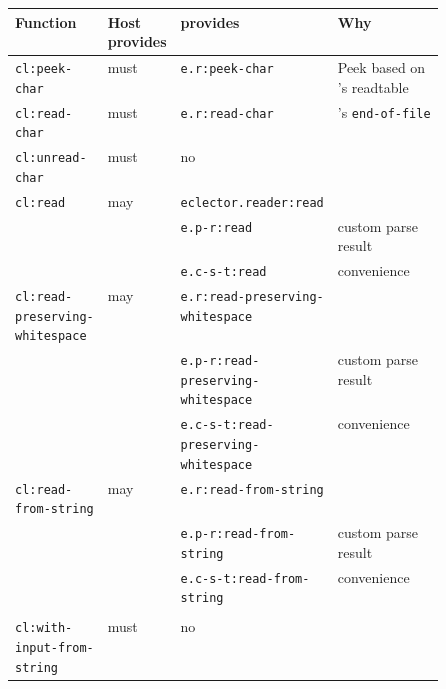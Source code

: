 \begin{table}
  \begin{tabular}{l|p{.08\linewidth}|p{0.25\linewidth}|p{0.25\linewidth}}
    Function                               & Host provides & \sysname{} provides                         & Why \\
    \hline
    \texttt{cl:peek-char}                  & must          & \texttt{e.r:peek-char}                      & Peek based on \sysname{}'s readtable\\
    \texttt{cl:read-char}                  & must          & \texttt{e.r:read-char}                      & \sysname{}'s \texttt{end-of-file}\\
    \texttt{cl:unread-char}                & must          & no                                          & \\
    \hline
    \texttt{cl:read}                       & may           & \texttt{eclector.reader:read}               & \\
                                           &               & \texttt{e.p-r:read}                         & custom parse result \\
                                           &               & \texttt{e.c-s-t:read}                       & convenience \\
    \texttt{cl:read-preserving-whitespace} & may           & \texttt{e.r:read-preserving-whitespace}     & \\
                                           &               & \texttt{e.p-r:read-preserving-whitespace}   & custom parse result \\
                                           &               & \texttt{e.c-s-t:read-preserving-whitespace} & convenience \\
    \texttt{cl:read-from-string}           & may           & \texttt{e.r:read-from-string}               & \\
                                           &               & \texttt{e.p-r:read-from-string}             & custom parse result \\
                                           &               & \texttt{e.c-s-t:read-from-string}           & convenience \\
                                                                                                     & \\
    \hline
    \texttt{cl:with-input-from-string}     & must          & no                                      & \\
  \end{tabular}
\end{table}

